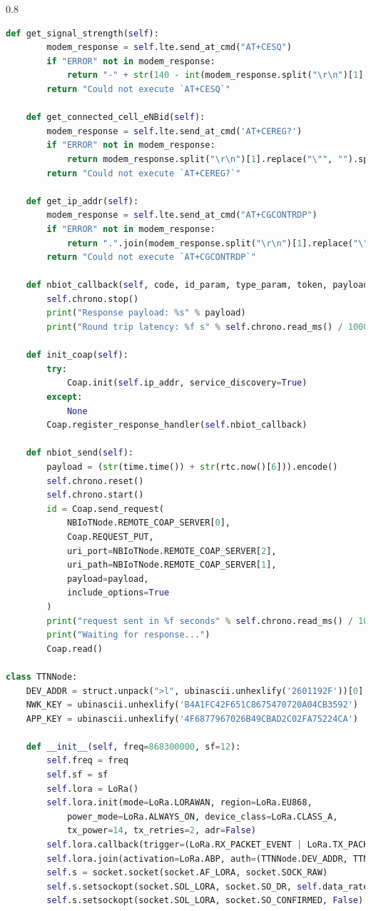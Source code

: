 \documentclass[12pt]{article}
\begin{document}
\begin{spacing}{0.8}
\begin{lstlisting}[language=Python]
    def get_signal_strength(self):
        modem_response = self.lte.send_at_cmd("AT+CESQ")
        if "ERROR" not in modem_response:
            return "-" + str(140 - int(modem_response.split("\r\n")[1].split(",")[-1])) + " dBm"
        return "Could not execute `AT+CESQ`"

    def get_connected_cell_eNBid(self):
        modem_response = self.lte.send_at_cmd('AT+CEREG?')
        if "ERROR" not in modem_response:
            return modem_response.split("\r\n")[1].replace("\"", "").split(",")[3][:-2]
        return "Could not execute `AT+CEREG?`"

    def get_ip_addr(self):
        modem_response = self.lte.send_at_cmd("AT+CGCONTRDP")
        if "ERROR" not in modem_response:
            return ".".join(modem_response.split("\r\n")[1].replace("\"", "").split(",")[3].split(".")[:4])
        return "Could not execute `AT+CGCONTRDP`"

    def nbiot_callback(self, code, id_param, type_param, token, payload):
        self.chrono.stop()
        print("Response payload: %s" % payload)
        print("Round trip latency: %f s" % self.chrono.read_ms() / 1000.0)

    def init_coap(self):
        try:
            Coap.init(self.ip_addr, service_discovery=True)
        except:
            None
        Coap.register_response_handler(self.nbiot_callback)

    def nbiot_send(self):
        payload = (str(time.time()) + str(rtc.now()[6])).encode()
        self.chrono.reset()
        self.chrono.start()
        id = Coap.send_request(
            NBIoTNode.REMOTE_COAP_SERVER[0],
            Coap.REQUEST_PUT,
            uri_port=NBIoTNode.REMOTE_COAP_SERVER[2],
            uri_path=NBIoTNode.REMOTE_COAP_SERVER[1],
            payload=payload,
            include_options=True
        )
        print("request sent in %f seconds" % self.chrono.read_ms() / 1000.0)
        print("Waiting for response...")
        Coap.read()

class TTNNode:
    DEV_ADDR = struct.unpack(">l", ubinascii.unhexlify('2601192F'))[0]
    NWK_KEY = ubinascii.unhexlify('B4A1FC42F651C8675470720A04CB3592')
    APP_KEY = ubinascii.unhexlify('4F6877967026B49CBAD2C02FA75224CA')

    def __init__(self, freq=868300000, sf=12):
        self.freq = freq
        self.sf = sf
        self.lora = LoRa()
        self.lora.init(mode=LoRa.LORAWAN, region=LoRa.EU868,
            power_mode=LoRa.ALWAYS_ON, device_class=LoRa.CLASS_A,
            tx_power=14, tx_retries=2, adr=False)
        self.lora.callback(trigger=(LoRa.RX_PACKET_EVENT | LoRa.TX_PACKET_EVENT), handler=self.callback)
        self.lora.join(activation=LoRa.ABP, auth=(TTNNode.DEV_ADDR, TTNNode.NWK_KEY, TTNNode.APP_KEY), timeout=0, dr=self.data_rate())
        self.s = socket.socket(socket.AF_LORA, socket.SOCK_RAW)
        self.s.setsockopt(socket.SOL_LORA, socket.SO_DR, self.data_rate())   # Data Rate
        self.s.setsockopt(socket.SOL_LORA, socket.SO_CONFIRMED, False)       # ACK



\end{lstlisting}
\end{spacing}
\end{document}
